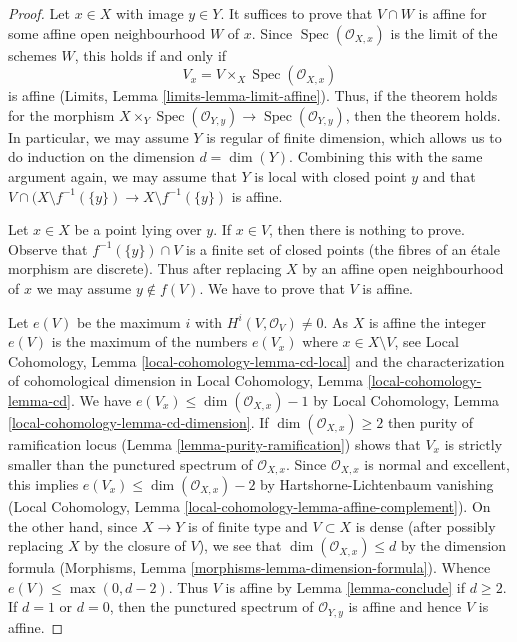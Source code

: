 \documentclass{stacks-project}
\theoremstyle{plain}
\theoremstyle{definition}
\theoremstyle{remark}
\numberwithin{equation}{subsection}
\def\Spec{\mathop{\mathrm{Spec}}}
\begin{document}
\begin{proof}
Let $x \in X$ with image $y \in Y$. It suffices to prove that
$V \cap W$ is affine for some affine open neighbourhood $W$ of $x$.
Since $\Spec(\mathcal{O}_{X, x})$ is the limit of the schemes $W$,
this holds if and only if
$$
V_x = V \times_X \Spec(\mathcal{O}_{X, x})
$$
is affine (Limits, Lemma \ref{limits-lemma-limit-affine}).
Thus, if the theorem holds for the morphism
$X \times_Y \Spec(\mathcal{O}_{Y, y}) \to \Spec(\mathcal{O}_{Y, y})$,
then the theorem holds. In particular, we may assume $Y$
is regular of finite dimension, which allows us to do induction
on the dimension $d = \dim(Y)$. Combining this with the same argument again,
we may assume that $Y$ is local with closed point $y$ and that
$V \cap (X \setminus f^{-1}(\{y\}) \to X \setminus f^{-1}(\{y\})$
is affine.

\medskip\noindent
Let $x \in X$ be a point lying over $y$. If $x \in V$, then
there is nothing to prove. Observe that  $f^{-1}(\{y\}) \cap V$
is a finite set of closed points (the fibres of an \'etale morphism
are discrete). Thus after replacing $X$
by an affine open neighbourhood of $x$ we may assume
$y \not \in f(V)$. We have to prove that $V$ is affine.

\medskip\noindent
Let $e(V)$ be the maximum $i$ with $H^i(V, \mathcal{O}_V) \not = 0$.
As $X$ is affine the integer $e(V)$ is the maximum of the numbers $e(V_x)$
where $x \in X \setminus V$, see
Local Cohomology, Lemma \ref{local-cohomology-lemma-cd-local}
and the characterization of cohomological dimension
in Local Cohomology, Lemma \ref{local-cohomology-lemma-cd}.
We have $e(V_x) \leq \dim(\mathcal{O}_{X, x}) - 1$ by
Local Cohomology, Lemma \ref{local-cohomology-lemma-cd-dimension}.
If $\dim(\mathcal{O}_{X, x}) \geq 2$ then purity of
ramification locus (Lemma \ref{lemma-purity-ramification})
shows that $V_x$ is strictly smaller than the punctured spectrum of
$\mathcal{O}_{X, x}$. Since $\mathcal{O}_{X, x}$ is
normal and excellent, this implies
$e(V_x) \leq \dim(\mathcal{O}_{X, x}) - 2$ by
Hartshorne-Lichtenbaum vanishing
(Local Cohomology, Lemma \ref{local-cohomology-lemma-affine-complement}).
On the other hand, since $X \to Y$ is of finite type
and $V \subset X$ is dense (after possibly replacing $X$
by the closure of $V$), we see that $\dim(\mathcal{O}_{X, x}) \leq d$
by the dimension formula
(Morphisms, Lemma \ref{morphisms-lemma-dimension-formula}).
Whence $e(V) \leq \max(0, d -  2)$.
Thus $V$ is affine by Lemma \ref{lemma-conclude}
if $d \geq 2$. If $d = 1$ or $d = 0$, then the punctured spectrum of
$\mathcal{O}_{Y, y}$ is affine and hence $V$ is affine.
\end{proof}
\end{document}
